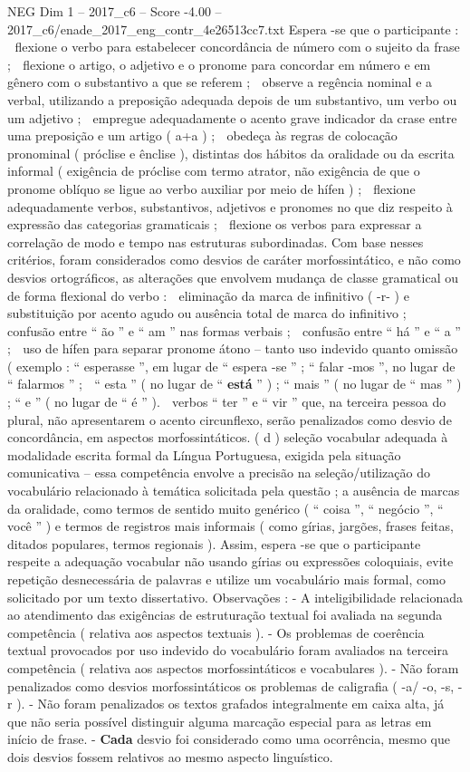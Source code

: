 \begin{textsample}{NEG Dim 1 – 2017\_c6 – Score -4.00 – 2017\_c6/enade\_2017\_eng\_contr\_4e26513cc7.txt}
Espera -se que o participante :  flexione o verbo para estabelecer concordância de número com o sujeito da frase ;  flexione o artigo, o adjetivo e o pronome para concordar em número e em gênero com o substantivo a que se referem ;  observe a regência nominal e a verbal, utilizando a preposição adequada depois de um substantivo, um verbo ou um adjetivo ;  empregue adequadamente o acento grave indicador da crase entre uma preposição e um artigo ( a+a ) ;  obedeça às regras de colocação pronominal ( próclise e ênclise ), distintas dos hábitos da oralidade ou da escrita informal ( exigência de próclise com termo atrator, não exigência de que o pronome oblíquo se ligue ao verbo auxiliar por meio de hífen ) ;  flexione adequadamente verbos, substantivos, adjetivos e pronomes no que diz respeito à expressão das categorias gramaticais ;  flexione os verbos para expressar a correlação de modo e tempo nas estruturas subordinadas.
Com base nesses critérios, foram considerados como desvios de caráter morfossintático, e não como desvios ortográficos, as alterações que envolvem mudança de classe gramatical ou de forma flexional do verbo :  eliminação da marca de infinitivo ( -r- ) e substituição por acento agudo ou ausência total de marca do infinitivo ;  confusão entre “ ão ” e “ am ” nas formas verbais ;  confusão entre “ há ” e “ a ” ;  uso de hífen para separar pronome átono – tanto uso indevido quanto omissão ( exemplo : “ esperasse ”, em lugar de “ espera -se ” ; “ falar -mos ”, no lugar de “ falarmos ” ;  “ esta ” ( no lugar de “ \textbf{está} ” ) ; “ mais ” ( no lugar de “ mas ” ) ; “ e ” ( no lugar de “ é ” ).  verbos “ ter ” e “ vir ” que, na terceira pessoa do plural, não apresentarem o acento circunflexo, serão penalizados como desvio de concordância, em aspectos morfossintáticos. ( d ) seleção vocabular adequada à modalidade escrita formal da Língua Portuguesa, exigida pela situação comunicativa – essa competência envolve a precisão na seleção/utilização do vocabulário relacionado à temática solicitada pela questão ; a ausência de marcas da oralidade, como termos de sentido muito genérico ( “ coisa ”, “ negócio ”, “ você ” ) e termos de registros mais informais ( como gírias, jargões, frases feitas, ditados populares, termos regionais ).
Assim, espera -se que o participante respeite a adequação vocabular não usando gírias ou expressões coloquiais, evite repetição desnecessária de palavras e utilize um vocabulário mais formal, como solicitado por um texto dissertativo.
Observações : - A inteligibilidade relacionada ao atendimento das exigências de estruturação textual foi avaliada na segunda competência ( relativa aos aspectos textuais ). - Os problemas de coerência textual provocados por uso indevido do vocabulário foram avaliados na terceira competência ( relativa aos aspectos morfossintáticos e vocabulares ). - Não foram penalizados como desvios morfossintáticos os problemas de caligrafia ( -a/ -o, -s, -r ). - Não foram penalizados os textos grafados integralmente em caixa alta, já que não seria possível distinguir alguma marcação especial para as letras em início de frase. - \textbf{Cada} desvio foi considerado como uma ocorrência, mesmo que dois desvios fossem relativos ao mesmo aspecto linguístico.

\end{textsample}
